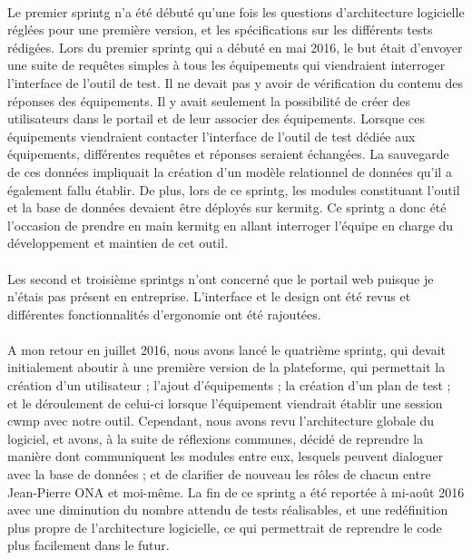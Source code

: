 \documentclass[12pt,a4paper]{report}
\begin{document}
\paragraph*{}Le premier \gls{sprintg} n’a été débuté qu’une fois les questions d’architecture logicielle réglées pour une première version, et les spécifications sur les différents tests rédigées. Lors du premier \gls{sprintg} qui a débuté en mai 2016, le but était d’envoyer une suite de requêtes simples à tous les équipements qui viendraient interroger l’interface de l’outil de test. Il ne devait pas y avoir de vérification du contenu des réponses des équipements. Il y avait seulement la possibilité de créer des utilisateurs dans le portail et de leur associer des équipements. Lorsque ces équipements viendraient contacter l’interface de l’outil de test dédiée aux équipements, différentes requêtes et réponses seraient échangées. La sauvegarde de ces données impliquait la création d’un modèle relationnel de données qu’il a également fallu établir. De plus, lors de ce \gls{sprintg}, les modules constituant l’outil et la base de données devaient être déployés sur \gls{kermitg}. Ce \gls{sprintg} a donc été l’occasion de prendre en main \gls{kermitg} en allant interroger l’équipe en charge du développement et maintien de cet outil.
\paragraph*{}Les second et troisième \gls{sprintg}s n’ont concerné que le portail web
puisque je n’étais pas présent en entreprise. L’interface et le design ont été revus et différentes fonctionnalités d’ergonomie ont été rajoutées.
\paragraph*{} A mon retour en juillet 2016, nous avons lancé le quatrième \gls{sprintg}, qui devait initialement aboutir à une première version de la plateforme, qui permettait la création d’un utilisateur ; l’ajout d’équipements ; la création d’un plan de test ; et le déroulement de celui-ci lorsque l’équipement viendrait établir une session \gls{cwmp} avec notre outil. Cependant, nous avons revu l’architecture globale du logiciel, et avons, à la suite de réflexions communes, décidé de reprendre la manière dont communiquent les modules entre eux, lesquels peuvent dialoguer avec la base de données ; et de clarifier de nouveau les rôles de chacun entre Jean-Pierre ONA et moi-même. La fin de ce \gls{sprintg} a été reportée à mi-août 2016 avec une diminution du nombre attendu de tests réalisables, et une redéfinition plus propre de l’architecture logicielle, ce qui permettrait de reprendre le code plus facilement dans le futur.
\end{document}
